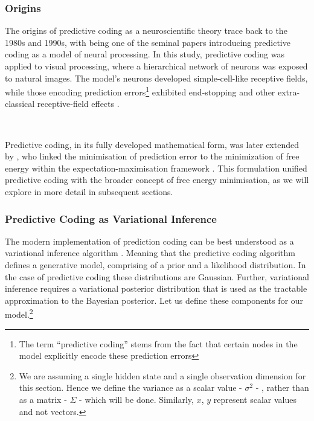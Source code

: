 \documentclass{article}
\begin{document}
\subsubsection{Origins}

The origins of predictive coding as a neuroscientific theory trace back to the 1980s and 1990s, with \citet{rao1999predictive} being one of the seminal papers introducing predictive coding as a model of neural processing. In this study, predictive coding was applied to visual processing, where a hierarchical network of neurons was exposed to natural images. The model's neurons developed simple-cell-like receptive fields, while those encoding prediction errors\footnote{The term ``predictive coding'' stems from the fact that certain nodes in the model explicitly encode these prediction errors} exhibited end-stopping and other extra-classical receptive-field effects \citep{rao1999predictive}.

\

Predictive coding, in its fully developed mathematical form, was later extended by \citet{friston2003learning, friston2005theory}, who linked the minimisation of prediction error to the minimization of free energy within the expectation-maximisation framework \citep{dempster1977maximum}. This formulation unified predictive coding with the broader concept of free energy minimisation, as we will explore in more detail in subsequent sections.

\subsubsection{Predictive Coding as Variational Inference}

The modern implementation of prediction coding can be best understood as a variational inference algorithm \citep{millidge2021applications}. Meaning that the predictive coding algorithm defines a generative model, comprising of a prior and a likelihood distribution. In the case of predictive coding these distributions are Gaussian. Further, variational inference requires a variational posterior distribution that is used as the tractable approximation to the Bayesian posterior. Let us define these components for our model.\footnote{We are assuming a single hidden state and a single observation dimension for this section. Hence we define the variance as a scalar value - $\sigma^2$ - , rather than as a matrix - $\Sigma$ - which will be done. Similarly, $x$, $y$ represent scalar values and not vectors. }
\end{document}
